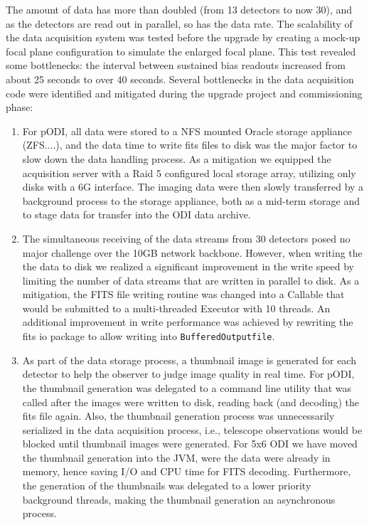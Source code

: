 \documentclass[]{spieman}
\begin{document}
The amount of data has more than doubled (from 13 detectors to now 30), and as
the detectors are read out in parallel, so has the data rate. The scalability of
the data acquisition system was tested before the upgrade by creating a mock-up
focal plane  configuration to simulate the enlarged focal plane. This test
revealed some bottlenecks: the interval between sustained bias readouts
increased from about 25 seconds to over 40 seconds. Several bottlenecks in the
data acquisition code were identified and mitigated during the upgrade project
and commissioning phase:


\begin{enumerate} 
    
\item For pODI, all data were stored to a NFS mounted Oracle storage appliance
(ZFS....), and the data time to write fits files to disk was the major factor to
slow down the data handling process. As a mitigation we equipped the acquisition
server with a Raid 5 configured local storage array, utilizing only disks with a
6G interface. The imaging data were then slowly transferred by a background
process to the storage appliance, both as a mid-term storage and to stage data
for transfer into the ODI data archive.

\item  The simultaneous receiving of the data streams from 30 detectors posed no
major challenge over the 10GB network backbone.  However, when writing the the
data to disk we realized a significant  improvement in the write speed by
limiting the number of data streams that are written in parallel to disk. As a
mitigation, the FITS file writing routine was changed into a Callable that would
be submitted to a multi-threaded Executor with 10 threads. An additional
improvement in write performance was achieved by rewriting the fits io package
to allow writing into {\tt BufferedOutputfile}.

\item As part of the data storage process, a thumbnail image is generated for
each detector to help the observer to judge image quality in real time. For
pODI, the thumbnail generation was delegated to a command line utility that was
called after the images were written to disk, reading back (and decoding) the
fits file again. Also, the thumbnail generation process was unnecessarily
serialized in the data acquisition process, i.e., telescope observations would
be blocked until thumbnail images were generated.  For 5x6 ODI we have moved the
thumbnail generation into the JVM, were the data were already in memory, hence
saving I/O and CPU time for FITS decoding. Furthermore, the generation of the
thumbnails was delegated to a lower priority background threads, making the
thumbnail generation an asynchronous process.

    
\end{enumerate}
\end{document}
